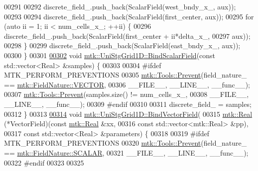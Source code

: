 \begin{DoxyCode}
00291 
00292   discrete\_field\_.push\_back(ScalarField(west\_bndy\_x\_, aux));
00293 
00294   discrete\_field\_.push\_back(ScalarField(first\_center, aux));
00295   \textcolor{keywordflow}{for} (\textcolor{keyword}{auto} ii = 1; ii < num\_cells\_x\_; ++ii) \{
00296     discrete\_field\_.push\_back(ScalarField(first\_center + ii*delta\_x\_,
00297                                           aux));
00298   \}
00299   discrete\_field\_.push\_back(ScalarField(east\_bndy\_x\_, aux));
00300 \}
00301 
\hypertarget{mtk__uni__stg__grid__1d_8cc_source_l00302}{}\hyperlink{classmtk_1_1UniStgGrid1D_af267608747876c776905679f548982e3}{00302} \textcolor{keywordtype}{void} \hyperlink{classmtk_1_1UniStgGrid1D_a6ad3040de719dff71d934f0062e9860f}{mtk::UniStgGrid1D::BindScalarField}(\textcolor{keyword}{const} std::vector<Real> &samples)
       \{
00303 
00304 \textcolor{preprocessor}{  #ifdef MTK\_PERFORM\_PREVENTIONS}
00305   \hyperlink{classmtk_1_1Tools_a332324c6f25e66be9dff48c5987a3b9f}{mtk::Tools::Prevent}(field\_nature\_ == 
      \hyperlink{namespacemtk_ga4c54f2a329cfb4e56213b02a259d19e2a87752381b583740610f1dfeb07fdad7e}{mtk::FieldNature::VECTOR},
00306                       \_\_FILE\_\_, \_\_LINE\_\_, \_\_func\_\_);
00307   \hyperlink{classmtk_1_1Tools_a332324c6f25e66be9dff48c5987a3b9f}{mtk::Tools::Prevent}(samples.size() != num\_cells\_x\_,
00308                       \_\_FILE\_\_, \_\_LINE\_\_, \_\_func\_\_);
00309 \textcolor{preprocessor}{  #endif}
00310 
00311   discrete\_field\_ = samples;
00312 \}
00313 
\hypertarget{mtk__uni__stg__grid__1d_8cc_source_l00314}{}\hyperlink{classmtk_1_1UniStgGrid1D_ac6f8c592636dfa5a92217ac82405976d}{00314} \textcolor{keywordtype}{void} \hyperlink{classmtk_1_1UniStgGrid1D_ac6f8c592636dfa5a92217ac82405976d}{mtk::UniStgGrid1D::BindVectorField}(
00315     \hyperlink{group__c01-roots_gac080bbbf5cbb5502c9f00405f894857d}{mtk::Real} (*VectorField)(\textcolor{keyword}{const} \hyperlink{group__c01-roots_gac080bbbf5cbb5502c9f00405f894857d}{mtk::Real} &xx,
00316                              \textcolor{keyword}{const} std::vector<mtk::Real> &pp),
00317     \textcolor{keyword}{const} std::vector<Real> &parameters) \{
00318 
00319 \textcolor{preprocessor}{  #ifdef MTK\_PERFORM\_PREVENTIONS}
00320   \hyperlink{classmtk_1_1Tools_a332324c6f25e66be9dff48c5987a3b9f}{mtk::Tools::Prevent}(field\_nature\_ == 
      \hyperlink{namespacemtk_ga4c54f2a329cfb4e56213b02a259d19e2a8f3d9a4b6a7b7f2c7afa61ca113d0db9}{mtk::FieldNature::SCALAR},
00321                       \_\_FILE\_\_, \_\_LINE\_\_, \_\_func\_\_);
00322 \textcolor{preprocessor}{  #endif}
00323 
00325 

\end{DoxyCode}
